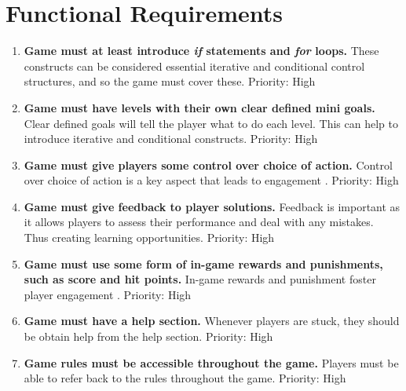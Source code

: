 \documentclass[a4paper,11.5pt]{report}
\numberwithin{figure}{section}
\numberwithin{table}{section}
\numberwithin{equation}{section}
\numberwithin{equation}{section}
\begin{document}
\section{Functional Requirements}

\begin{enumerate}[label=3.2.\arabic*]

  \item \textbf{Game must at least introduce \textit{if} statements and \textit{for} loops.} These constructs can be considered essential iterative and conditional control structures, and so the game must cover these. \newline Priority: High
  
  \item \textbf{Game must have levels with their own clear defined mini goals.} Clear defined goals will tell the player what to do each level. This can help to introduce iterative and conditional constructs. \newline Priority: High
  
  \item \textbf{Game must give players some control over choice of action.} Control over choice of action is a key aspect that leads to engagement \citep{whitton2011}. \newline Priority: High

  \item \textbf{Game must give feedback to player solutions.} Feedback is important as it allows players to assess their performance and deal with any mistakes. Thus creating learning opportunities. \newline Priority: High
  
  \item \textbf{Game must use some form of in-game rewards and punishments, such as score and hit points.} In-game rewards and punishment foster player engagement \citep{roungas2015}. \newline Priority: High
  
  \item \textbf{Game must have a help section.} Whenever players are stuck, they should be obtain help from the help section. \newline Priority: High
  
  \item \textbf{Game rules must be accessible throughout the game.} Players must be able to refer back to the rules throughout the game. \newline Priority: High
  

\end{enumerate}
\end{document}
